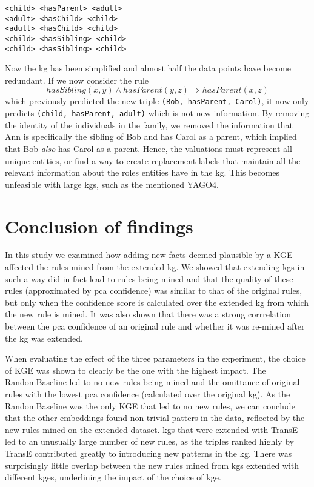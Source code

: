 \begin{example}
\begin{lstlisting}[]
<child> <hasParent> <adult>
<adult> <hasChild> <child>
<adult> <hasChild> <child>
<child> <hasSibling> <child>
<child> <hasSibling> <child>
\end{lstlisting}
\label{mini_simple_KG_rules}
\end{example}

Now the \gls{kg} has been simplified and almost half the data points have become redundant. If we now consider the rule \[hasSibling(x, y) \wedge hasParent(y,z) \Rightarrow hasParent(x,z)\] which previously predicted the new triple \texttt{(Bob, hasParent, Carol)}, it now only predicts \texttt{(child, hasParent, adult)} which is not new information. By removing the identity of the individuals in the family, we removed the information that Ann is specifically the sibling of Bob and has Carol as a parent, which implied that Bob \textit{also} has Carol as a parent. Hence, the valuations must represent all unique entities, or find a way to create replacement labels that maintain all the relevant information about the roles entities have in the \gls{kg}. This becomes unfeasible with large \glspl{kg}, such as the mentioned YAGO4.


\section{Conclusion of findings}
In this study we examined how adding new facts deemed plausible by a KGE affected the rules mined from the extended \gls{kg}. We showed that extending \glspl{kg} in such a way did in fact lead to rules being mined and that the quality of these rules (approximated by \gls{pca} confidence) was similar to that of the original rules, but only when the confidence score is calculated over the extended \gls{kg} from which the new rule is mined. It was also shown that there was a strong corrrelation between the \gls{pca} confidence of an original rule and whether it was re-mined after the \gls{kg} was extended.

When evaluating the effect of the three parameters in the experiment, the choice of KGE was shown to clearly be the one with the highest impact. The RandomBaseline led to no new rules being mined and the omittance of original rules with the lowest \gls{pca} confidence (calculated over the original \gls{kg}). As the RandomBaseline was the only KGE that led to no new rules, we can conclude that the other embeddings found non-trivial patters in the data, reflected by the new rules mined on the extended dataset. \glspl{kg} that were extended with TransE led to an unusually large number of new rules, as the triples ranked highly by TransE contributed greatly to introducing new patterns in the \gls{kg}. There was surprisingly little overlap between the new rules mined from \glspl{kg} extended with different \glspl{kge}, underlining the impact of the choice of \gls{kge}.

